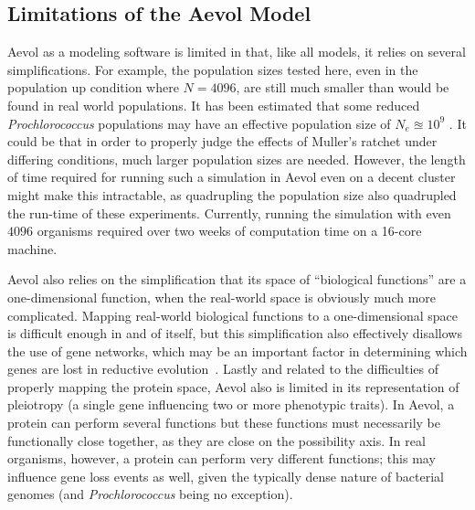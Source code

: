 \subsection{Limitations of the Aevol Model}
Aevol as a modeling software is limited in that, like all models, it relies on several simplifications. For example, the population sizes tested here, even in the population up condition where $N = 4096$, are still much smaller than would be found in real world populations. It has been estimated that some reduced \textit{Prochlorococcus} populations may have an effective population size of $N_e \approxeq 10^9$ \cite{kashtan2014single}. It could be that in order to properly judge the effects of Muller's ratchet under differing conditions, much larger population sizes are needed. However, the length of time required for running such a simulation in Aevol even on a decent cluster might make this intractable, as quadrupling the population size also quadrupled the run-time of these experiments. Currently, running the simulation with even $4096$ organisms required over two weeks of computation time on a 16-core machine. 

Aevol also relies on the simplification that its space of ``biological functions'' are a one-dimensional function, when the real-world space is obviously much more complicated. Mapping real-world biological functions to a one-dimensional space is difficult enough in and of itself, but this simplification also effectively disallows the use of gene networks, which may be an important factor in determining which genes are lost in reductive evolution~\cite{wilcox2003consequences}. Lastly and related to the difficulties of properly mapping the protein space, Aevol also is limited in its representation of pleiotropy (a single gene influencing two or more phenotypic traits). In Aevol, a protein can perform several functions but these functions must necessarily be functionally close together, as they are close on the possibility axis. In real organisms, however, a protein can perform very different functions; this may influence gene loss events as well, given the typically dense nature of bacterial genomes (and \textit{Prochlorococcus} being no exception).